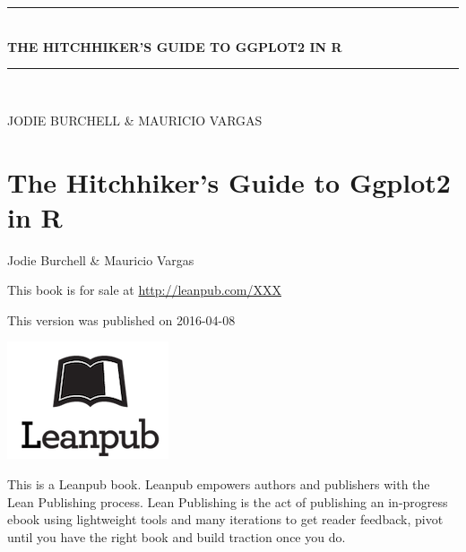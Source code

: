 \documentclass[11pt, oneside]{report}
\begin{document}
\begin{center} \end{center} %
\cleardoublepage

\newcommand{\HRule}{\rule{\linewidth}{0.5mm}}
\begin{titlepage}
{\sffamily 
	\begin{center}
		\vspace*{\fill}
		\HRule \\[0.4cm]{
		\huge \bfseries THE HITCHHIKER'S GUIDE TO GGPLOT2 IN R}\\ [0.4cm]
		\HRule \\[1.5cm]
		\begin{minipage}{0.9\textwidth}
		\begin{center}
		\large
		JODIE BURCHELL \& MAURICIO VARGAS
		\end{center}
		\end{minipage}
	\vfill
	\end{center}}
\end{titlepage}
\setcounter{page}{2}
\setlength\parindent{0pt} %
\renewcommand{\labelenumi}{\alph{enumi}.} %
\newpage

\chapter*{The Hitchhiker's Guide to Ggplot2 in R}

Jodie Burchell \& Mauricio Vargas

This book is for sale at \href{http://leanpub.com/XXX}{http://leanpub.com/XXX} 

This version was published on 2016-04-08

\includegraphics[scale=0.5]{leanpub}

This is a Leanpub book. Leanpub empowers authors and publishers with the Lean Publishing process. Lean Publishing is the act of publishing an in-progress ebook using lightweight tools and many iterations to get reader feedback, pivot until you have the right book and build traction once you do.
\end{document}
